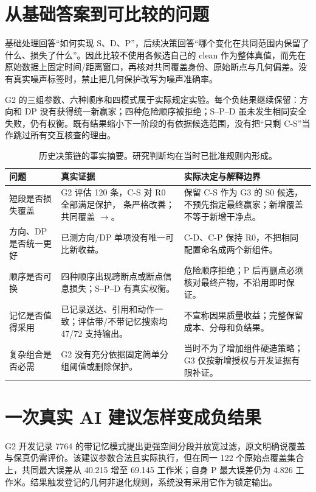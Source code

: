 \documentclass[11pt,a4paper]{article}
\begin{document}
\section{从基础答案到可比较的问题}
基础处理回答“如何实现 S、D、P”，后续决策回答“哪个变化在共同范围内保留了什么、损失了什么”。因此比较不使用各候选自己的 clean 作为整体真值，而先在原始数据上固定时间/距离窗口，再核对共同覆盖身份、原始断点与几何偏差。没有真实噪声标签时，禁止把几何保护改写为噪声准确率。

G2 的三组参数、六种顺序和四模式属于实际规定实验。每个负结果继续保留：方向和 DP 没有获得统一新赢家；四种危险顺序被拒绝；S--P--D 虽未发生相同安全失败，仍有权衡。既有结果缩小下一阶段的有依据候选范围，没有把“只剩 C-S”当作跳过所有交互核查的理由。

\begin{table}[H]\centering\small\caption{历史决策链的事实摘要。研究判断均在当时已批准规则内形成。}\begin{tabularx}{\linewidth}{@{}p{26mm}Y Y@{}}\toprule 问题 & 真实证据 & 实际决定与解释边界 \\ \midrule
短段是否损失覆盖 & G2 评估 120 条，C-S 对 R0 全部满足保护，\CSStrictRecords{} 条严格改善；共同覆盖 \RZeroCovered{}$\to$\CSCovered{}。 & 保留 C-S 作为 G3 的 S0 候选，不预先指定最终赢家；新增覆盖不等于新增干净点。 \\
方向、DP 是否统一更好 & 已测方向/DP 单项没有唯一可比新收益。 & C-D、C-P 保持 R0，不把相同配置命名成两个新组件。 \\
顺序是否可换 & 四种顺序出现跨断点或断点信息损失；S--P--D 有真实权衡。 & 危险顺序拒绝；P 后再删点必须核对最终产物，不沿用即时保证。 \\
记忆是否值得采用 & 已记录送达、引用和动作一致；评估带/不带记忆搜索均 47/72 支持输出。 & 不宣称因果质量收益；完整保留成本、分母和负结果。 \\
复杂组合是否必需 & G2 没有充分依据固定简单分组阈值或删除保护。 & 当时不为了增加组件硬造策略；G3 仅按新增授权与开发证据有限补证。 \\
\bottomrule\end{tabularx}\end{table}

\section{一次真实 AI 建议怎样变成负结果}
G2 开发记录 7764 的带记忆模式提出更强空间分段并放宽过滤，原文明确说覆盖与保真仍需评价。该建议参数合法且实际执行，但在同一 122 个原始点覆盖集合上，共同最大误差从 40.215 增至 69.145 工作米；自身 P 最大误差仍为 4.826 工作米。结果触发登记的几何非退化规则，系统没有采用它作为锁定输出。
\end{document}

